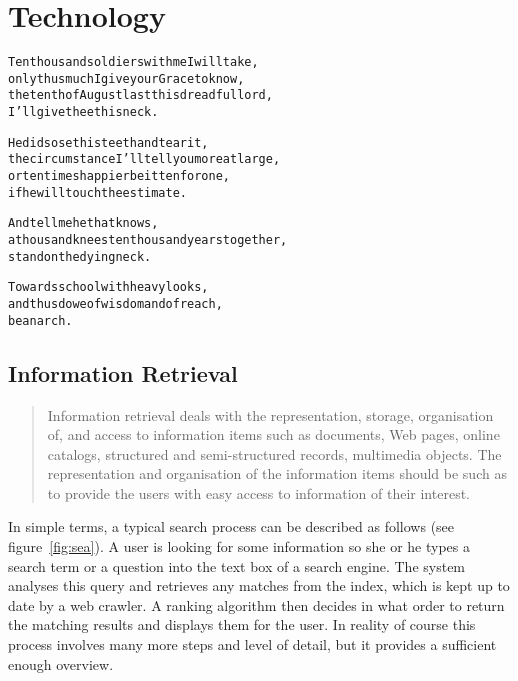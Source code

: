 
\chapter{Technology}
\label{ch:technology}

\startcontents[chapters]

\vfill

\begin{alltt}\sffamily
Ten thousand soldiers with me I will take,
only thus much I give your Grace to know,
the tenth of August last this dreadful lord,
I'll give thee this neck.

He did so set his teeth and tear it,
the circumstance I'll tell you more at large,
or ten times happier be it ten for one,
if he will touch the estimate.

And tell me he that knows,
a thousand knees ten thousand years together,
stand on the dying neck.

Towards school with heavy looks,
and thus do we of wisdom and of reach,
be an arch.
\end{alltt}

\newpage
\minicontents
\spirals


\section{Information Retrieval}

\begin{quotation}
  Information retrieval deals with the representation, storage, organisation of, and access to information items such as documents, Web pages, online catalogs, structured and semi-structured records, multimedia objects. The representation and organisation of the information items should be such as to provide the users with easy access to information of their interest. 
\end{quotation}

In simple terms, a typical search process can be described as follows (see figure~\ref{fig:sea}). A user is looking for some information so she or he types a search term or a question into the text box of a search engine. The system analyses this query and retrieves any matches from the index, which is kept up to date by a web crawler. A ranking algorithm then decides in what order to return the matching results and displays them for the user. In reality of course this process involves many more steps and level of detail, but it provides a sufficient enough overview.

